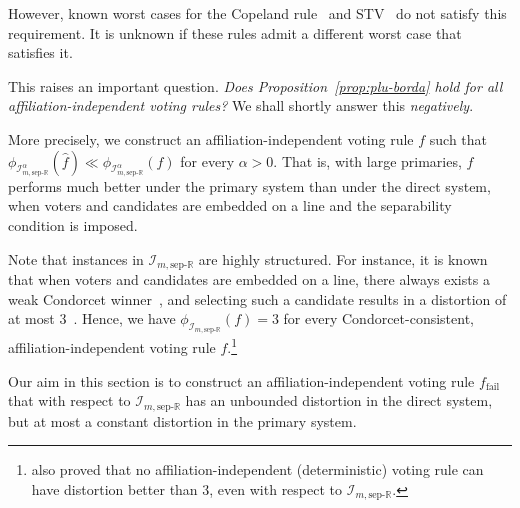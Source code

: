 \documentclass[letterpaper]{article} %
\theoremstyle{definition}
\renewcommand{\hat}{\widehat}
\newcommand{\bbR}{\mathbb{R}}
\newcommand{\calI}{\mathcal{I}}
\newcommand{\sep}{\textrm{sep-}}
\newcommand{\eucline}{\bbR}
\newcommand{\euclinesep}{\sep\eucline}
\newcommand{\I}{\calI}
\newcommand{\fail}{{\textrm{fail}}}
\begin{document}
However, known worst cases for the Copeland rule~\cite{ABP15} and STV~\cite{SE17} do not satisfy this requirement. It is unknown if these rules admit a different worst case that satisfies it. 

This raises an important question. \emph{Does Proposition~\ref{prop:plu-borda} hold for all affiliation-independent voting rules?} We shall shortly answer this \emph{negatively}.

More precisely, we construct an affiliation-independent voting rule $f$ such that $\phi_{\I^{\alpha}_{m,\euclinesep}}(\hat{f}) \ll \phi_{\I^{\alpha}_{m,\euclinesep}}(f)$ for every $\alpha > 0$. That is, with large primaries, $f$ performs much better under the primary system than under the direct system, when voters and candidates are embedded on a line and the separability condition is imposed. 

Note that instances in $\I_{m,\euclinesep}$ are highly structured. For instance, it is known that when voters and candidates are embedded on a line, there always exists a weak Condorcet winner~\cite{Bla48}, and selecting such a candidate results in a distortion of at most $3$~\cite{ABP15}. Hence, we have $\phi_{\I_{m,\euclinesep}}(f) = 3$ for every Condorcet-consistent, affiliation-independent voting rule $f$.\footnote{\cite{ABP15} also proved that no affiliation-independent (deterministic) voting rule can have distortion better than $3$, even with respect to $\I_{m,\euclinesep}$.}

Our aim in this section is to construct an affiliation-independent voting rule $f_\fail$ that with respect to $\I_{m,\euclinesep}$ has an unbounded distortion in the direct system, but at most a constant distortion in the primary system.%
\end{document}

